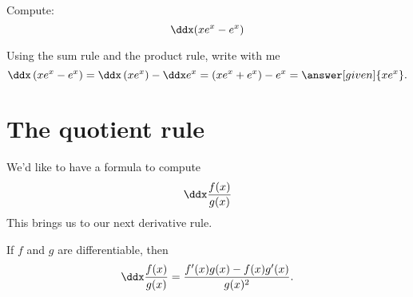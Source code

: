\documentclass{ximera}
\begin{document}
\begin{example} 
Compute:
\[
\ddx(xe^x-e^x)
\]
\begin{explanation}
Using the sum rule and the product rule, write with me
\[
\ddx \left(xe^x-e^x \right) =\ddx \left(xe^x\right)-\ddx e^x  =(xe^x+e^x)-e^x=\answer[given]{x e^x}.
\]
\end{explanation}
\end{example}


\section{The quotient rule}


We'd like to have a formula to compute
\[
\ddx \frac{f(x)}{g(x)}
\]
 This brings us to our next derivative rule.

\begin{theorem}\label{theorem:quotient-rule}
If $f$ and $g$ are differentiable, then
\[
\ddx \frac{f(x)}{g(x)} = \frac{f'(x)g(x)-f(x)g'(x)}{g(x)^2}.
\]
\end{theorem}

\end{document}
